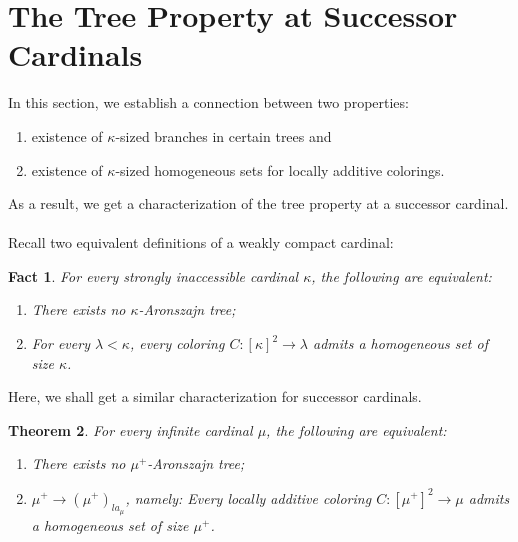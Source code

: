 \documentclass[11pt]{amsart}
\theoremstyle{plain}
\newtheorem{theorem}{Theorem}[section]
\newtheorem{fact}[theorem]{Fact}
\theoremstyle{definition} %
\theoremstyle{remark}
\newcommand{\be}{\begin{enumerate}}
\newcommand{\ee}{\end{enumerate}}
\begin{document}
\section{The Tree Property at Successor Cardinals}\label{section the tree property at successor cardinals}
In this section, we establish a connection between two properties:
\be
\item
existence of $\kappa$-sized branches in certain trees and
\item
existence of $\kappa$-sized homogeneous sets for locally additive colorings.
\ee
As a result, we get a characterization of the tree property at a successor cardinal.
$ $\\


Recall two equivalent definitions of a weakly compact cardinal:
\begin{fact} For every strongly inaccessible cardinal $\kappa$, the following are equivalent:
\begin{enumerate}
\item There exists no $\kappa$-Aronszajn tree;
\item For every $\lambda<\kappa$, every coloring $C:[\kappa]^2\rightarrow\lambda$ admits a homogeneous set of size $\kappa$.
\end{enumerate}
\end{fact}

Here, we shall get a similar characterization for successor cardinals.
\begin{theorem}\label{theorem 4.2}  For every infinite cardinal $\mu$, the following are equivalent:
\begin{enumerate}
\item There exists no $\mu^+$-Aronszajn tree;
\item $\mu^+ \rightarrow (\mu^+)_{la_\mu}$, namely: Every locally additive coloring $C:[\mu^+]^2\rightarrow\mu$ admits a homogeneous set of size $\mu^+$.
\end{enumerate}
\end{theorem}
\end{document}
